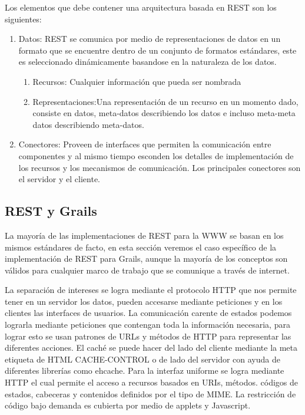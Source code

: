 \documentclass[12pt,a4paper,spanish,openany]{book}
\begin{document}
\newpage
Los elementos que debe contener una arquitectura basada en REST son los
siguientes:

\begin{enumerate}
  \item Datos: REST se comunica por medio de representaciones de datos en un
  formato que se encuentre dentro de un conjunto de formatos estándares,
  este es seleccionado dinámicamente basandose en la naturaleza de los datos.
  \begin{enumerate}
    \item Recursos: Cualquier información que pueda ser nombrada
    \item Representaciones:Una representación de un recurso en un momento
    dado, consiste en datos, meta-datos describiendo los datos e incluso
    meta-meta datos describiendo meta-datos.
  \end{enumerate}
  \item Conectores: Proveen de interfaces que permiten la comunicación entre
  componentes y al mismo tiempo esconden los detalles de implementación de los
  recursos y los mecanismos de comunicación. Los principales conectores son el
  servidor y el cliente.
\end{enumerate}

\subsection{REST y Grails}

La mayoría de las implementaciones de REST para la WWW se basan en los mismos
estándares de facto, en esta sección veremos el caso específico de la
implementación de REST para Grails, aunque la mayoría de los conceptos son
válidos para cualquier marco de trabajo que se comunique a través de internet.

La separación de intereses se logra mediante el protocolo HTTP que nos permite
tener en un servidor los datos, pueden accesarse mediante peticiones y en los
clientes las interfaces de usuarios.
La comunicación carente de estados podemos lograrla mediante peticiones que
contengan toda la información necesaria, para lograr esto se usan patrones de
URLs y métodos de HTTP para representar las diferentes acciones.
El caché se puede hacer del lado del cliente mediante la meta etiqueta de HTML
CACHE-CONTROL o de lado del servidor con ayuda de diferentes librerías como
ehcache.
Para la interfaz uniforme se logra mediante HTTP el cual permite el acceso a
recursos basados en URIs, métodos. códigos de estados, cabeceras y contenidos
definidos por el tipo de MIME.
La restricción de código bajo demanda es cubierta por medio de applets y
Javascript.
\end{document}
